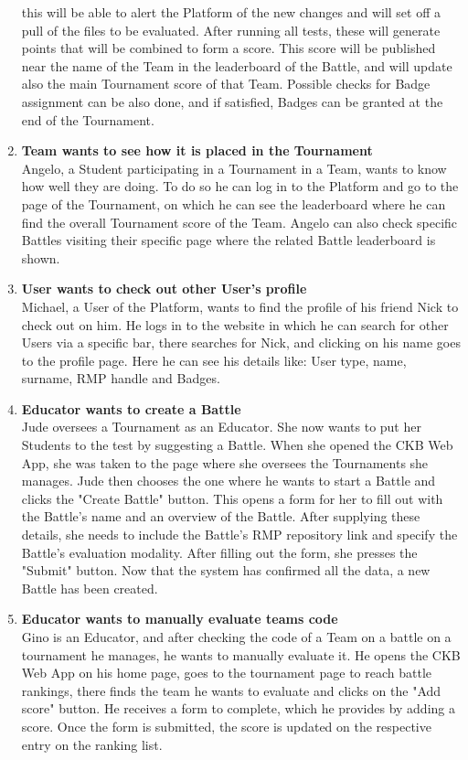 \begin{enumerate}[label= \textbf{SC\arabic*}]
    this will be able to alert the Platform of the new changes and will set off a pull of the files to be evaluated. After running all tests, these will generate points that will be combined to form a score. This score will be 
    published near the name of the Team in the leaderboard of the Battle, and will update also the main Tournament score of that Team. Possible checks for Badge assignment can be also done, and if satisfied, Badges can be granted at 
    the end of the Tournament.
    \item \textbf{Team wants to see how it is placed in the Tournament} \label{sc:sc9} \\ Angelo, a Student participating in a Tournament in a Team, wants to know how well they are doing. To do so he can log in to the Platform and go to the page 
    of the Tournament, on which he can see the leaderboard where he can find the overall Tournament score of the Team. Angelo can also check specific Battles visiting their specific page where the related Battle leaderboard is shown.
    \item \textbf{User wants to check out other User's profile} \label{sc:sc10} \\ Michael, a User of the Platform, wants to find the profile of his friend Nick to check out on him. He logs in to the website in which he can search for other Users 
    via a specific bar, there searches for Nick, and clicking on his name goes to the profile page. Here he can see his details like: User type, name, surname, RMP handle and Badges.
    \item \textbf{Educator wants to create a Battle} \label{sc:sc11} \\Jude oversees a Tournament as an Educator. She now wants to put her Students to the test by suggesting a Battle. When she opened the CKB Web App, she was taken to the page where she 
    oversees the Tournaments she manages. Jude then chooses the one where he wants to start a Battle and clicks the "Create Battle" button. This opens a form for her to fill out with the Battle's name and an overview of the Battle. 
    After supplying these details, she needs to include the Battle's RMP repository link and specify the Battle's evaluation modality. After filling out the form, she presses the "Submit" button. Now that the system has confirmed all 
    the data, a new Battle has been created.\\
    \item \textbf{Educator wants to manually evaluate teams code} \label{sc:sc12} \\ Gino is an Educator, and after checking the code of a Team on a battle on a tournament he manages, he wants to manually evaluate it. He opens the CKB Web App on his home page, goes to the tournament page to reach battle rankings, there finds the team he wants to evaluate and clicks on the "Add score" button. He receives a form to complete, which he provides by adding a score. Once the form is submitted, the score is updated on the respective entry on the ranking list.

\end{enumerate}
